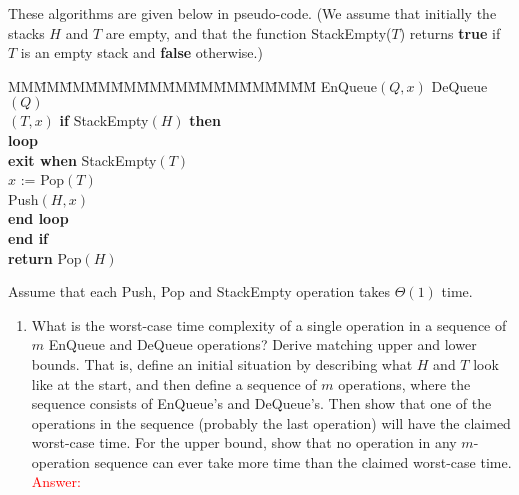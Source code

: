 \documentclass[11pt,twoside]{article}
\begin{document}
\begin{enumerate}[leftmargin=0pt]
These algorithms are given below in pseudo-code.
(We assume that initially the stacks $H$ and $T$ are empty, and
        that the function {\sc StackEmpty}($T$) returns {\bf true} if $T$ is
        an empty stack and {\bf false} otherwise.)

\smallskip
\begin{tabbing}
MM\=MM\=MM\=MM\=MM\=MM\=MM\=MM\=MM\=MM\=MM\=MM\=\kill
{\sc EnQueue}$(Q,x)$ \>\>\>\>\>\>\>\> {\sc DeQueue}$(Q)$\\
$(T,x)$  \>\>\>\>\>\>\>   \> {\bf if} {\sc StackEmpty}$(H)$ {\bf then}\\
                     \>\>\>\>\>\>\>\> \>\> {\bf loop}\\
                     \>\>\>\>\>\>\>\> \>\>\> {\bf exit when} {\sc StackEmpty}$(T)$\\
                     \>\>\>\>\>\>\>\> \>\>\> $x$ := {\sc Pop}$(T)$\\
                     \>\>\>\>\>\>\>\> \>\>\> {\sc Push}$(H,x)$\\
                     \>\>\>\>\>\>\>\> \>\> {\bf end loop}\\
                     \>\>\>\>\>\>\>\> \> {\bf end if}\\
                     \>\>\>\>\>\>\>\> \> {\bf return} {\sc Pop}$(H)$\\
\end{tabbing}

\noindent
Assume that each {\sc Push}, {\sc Pop} and {\sc StackEmpty} operation takes
        $\Theta(1)$ time.

\begin{enumerate}
\item
What is the worst-case time complexity of a single operation
        in a sequence of $m$ {\sc EnQueue} and {\sc DeQueue} operations?
Derive matching upper and lower bounds.
That is, define an initial situation by describing what $H$ and $T$
look like at the start, and then define a sequence of $m$ operations,
where the sequence consists of {\sc EnQueue}'s and {\sc DeQueue}'s.
Then show that one of the operations in the sequence (probably the last operation) will have
the claimed worst-case time.
For the upper bound, show that no operation in any $m$-operation sequence can ever
take more time than the claimed worst-case time. \\

\textcolor{red}{\sc Answer:}
\begin{itemize}[label = {}]


\end{itemize}
\end{enumerate}
\end{enumerate}
\end{document}
